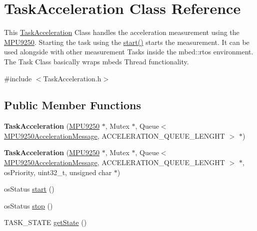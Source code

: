 \hypertarget{class_task_acceleration}{}\section{Task\+Acceleration Class Reference}
\label{class_task_acceleration}


This \hyperlink{class_task_acceleration}{Task\+Acceleration} Class handles the acceleration measurement using the \hyperlink{class_m_p_u9250}{M\+P\+U9250}. Starting the task using the \hyperlink{class_task_acceleration_aedfec3a60f517bbab4c8689dfd9c5c00}{start()} starts the measurement. It can be used alongside with other measurement Tasks inside the mbed\+::rtos environment. The Task Class basically wraps mbeds Thread functionality.  




{\ttfamily \#include $<$Task\+Acceleration.\+h$>$}

\subsection*{Public Member Functions}
\begin{DoxyCompactItemize}
\item 
\hypertarget{class_task_acceleration_a56d2be1e134cb1b780edfa7787949d44}{}{\bfseries Task\+Acceleration} (\hyperlink{class_m_p_u9250}{M\+P\+U9250} $\ast$, Mutex $\ast$, Queue$<$ \hyperlink{class_m_p_u9250_acceleration_message}{M\+P\+U9250\+Acceleration\+Message}, A\+C\+C\+E\+L\+E\+R\+A\+T\+I\+O\+N\+\_\+\+Q\+U\+E\+U\+E\+\_\+\+L\+E\+N\+G\+H\+T $>$ $\ast$)\label{class_task_acceleration_a56d2be1e134cb1b780edfa7787949d44}

\item 
\hypertarget{class_task_acceleration_a241a585bb371c0898cd6c922cbd6e684}{}{\bfseries Task\+Acceleration} (\hyperlink{class_m_p_u9250}{M\+P\+U9250} $\ast$, Mutex $\ast$, Queue$<$ \hyperlink{class_m_p_u9250_acceleration_message}{M\+P\+U9250\+Acceleration\+Message}, A\+C\+C\+E\+L\+E\+R\+A\+T\+I\+O\+N\+\_\+\+Q\+U\+E\+U\+E\+\_\+\+L\+E\+N\+G\+H\+T $>$ $\ast$, os\+Priority, uint32\+\_\+t, unsigned char $\ast$)\label{class_task_acceleration_a241a585bb371c0898cd6c922cbd6e684}

\item 
os\+Status \hyperlink{class_task_acceleration_aedfec3a60f517bbab4c8689dfd9c5c00}{start} ()
\item 
os\+Status \hyperlink{class_task_acceleration_af0ba8f331bca797340f0752187ab6914}{stop} ()
\item 
T\+A\+S\+K\+\_\+\+S\+T\+A\+T\+E \hyperlink{class_task_acceleration_a74d8657ad86fec38efae380a393679cc}{get\+State} ()
\end{DoxyCompactItemize}



